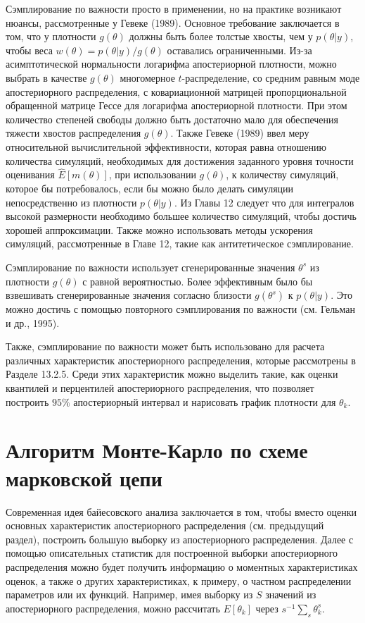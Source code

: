 Сэмплирование по важности просто в применении, но на практике возникают нюансы, рассмотренные  у Гевеке (1989). 
Основное требование заключается в том, что у плотности $g(\theta)$ должны быть более толстые хвосты, чем у $p(\theta|y)$, чтобы веса $w(\theta)=p(\theta|y)/g(\theta)$ оставались ограниченными. 
Из-за асимптотической нормальности логарифма апостериорной плотности, можно выбрать в качестве $g(\theta)$  многомерное $t$-распределение, со средним равным моде апостериорного распределения, с ковариационной матрицей пропорциональной обращенной матрице Гессе для логарифма апостериорной плотности. При этом количество степеней свободы должно быть достаточно мало для обеспечения тяжести хвостов распределения $g(\theta)$. Также Гевеке (1989) ввел меру относительной вычислительной эффективности, которая равна отношению количества симуляций, необходимых для достижения заданного уровня точности оценивания $\hat{E}[m(\theta)]$, при использовании $g(\theta)$, к количеству симуляций, которое бы потребовалось, если бы можно было делать симуляции непосредственно из плотности  $p(\theta|y)$. Из Главы 12 следует что для интегралов высокой размерности необходимо большее количество симуляций, чтобы достичь хорошей аппроксимации. Также можно использовать методы ускорения симуляций, рассмотренные в Главе 12, такие как антитетическое сэмплирование.

Сэмплирование по важности использует сгенерированные значения $\theta^s$ из плотности $g(\theta)$ с равной вероятностью. Более эффективным было бы взвешивать сгенерированные значения согласно близости  $g(\theta^s)$ к $p(\theta|y)$. Это можно достичь с помощью повторного сэмплирования по важности (см. Гельман и др., 1995).

Также, сэмплирование по важности может быть использовано для расчета различных характеристик апостериорного распределения, которые рассмотрены в Разделе 13.2.5. Среди этих характеристик  можно выделить такие, как оценки квантилей и перцентилей апостериорного распределения, что позволяет построить $95\%$ апостериорный интервал и нарисовать график плотности для $\theta_k$.

\section{Алгоритм Монте-Карло по схеме марковской цепи}

Современная идея байесовского анализа заключается в том, чтобы вместо оценки основных характеристик апостериорного распределения (см. предыдущий раздел), построить большую выборку из апостериорного распределения. Далее с помощью описательных статистик для построенной выборки апостериорного распределения можно будет получить информацию о моментных характеристиках  оценок, а также о других характеристиках, к примеру, о частном распределении параметров или их функций. Например, имея выборку из $S$ значений из апостериорного распределения, можно рассчитать $E[\theta_k]$ через $s^{-1}\sum_{s}\theta^{s}_k$.

